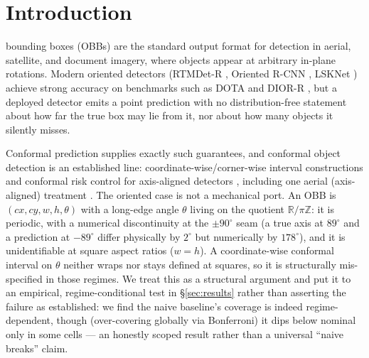 \documentclass[journal]{IEEEtran}
\begin{document}
\section{Introduction}\label{sec:intro}
 bounding boxes (OBBs) are the standard output format for detection in aerial,
satellite, and document imagery, where objects appear at arbitrary in-plane rotations. Modern oriented detectors
(RTMDet-R \citep{lyu2022rtmdet}, Oriented R-CNN \citep{xie2021orcnn}, LSKNet \citep{li2023lsknet}) achieve
strong accuracy on benchmarks such as DOTA \citep{xia2018dota} and DIOR-R \citep{cheng2022diorr}, but a
deployed detector emits a point prediction with no distribution-free statement about how far the true
box may lie from it, nor about how many objects it silently misses.

Conformal prediction supplies exactly such guarantees, and conformal object detection is an established line:
coordinate-wise/corner-wise interval constructions and conformal risk control for axis-aligned detectors
\citep{andeol2023conformal,timans2024twostep,andeol2025seqcrc,ries2026probabilistic,angelopoulos2022crc},
including one aerial (axis-aligned) treatment \citep{copley2024copa}. The oriented case is not a
mechanical port. An OBB is $(cx, cy, w, h, \theta)$ with a long-edge angle $\theta$ living on the quotient
$\mathbb{R}/\pi\mathbb{Z}$: it is periodic, with a numerical discontinuity at the $\pm 90^\circ$ seam (a true
axis at $89^\circ$ and a prediction at $-89^\circ$ differ physically by $2^\circ$ but numerically by
$178^\circ$), and it is unidentifiable at square aspect ratios ($w=h$). A coordinate-wise conformal interval
on $\theta$ neither wraps nor stays defined at squares, so it is structurally mis-specified in those
regimes. We treat this as a structural argument and put it to an empirical, regime-conditional test in
\S\ref{sec:results} rather than asserting the failure as established: we find the naive baseline's coverage is
indeed regime-dependent, though (over-covering globally via Bonferroni) it dips below nominal only in some
cells --- an honestly scoped result rather than a universal ``naive breaks'' claim.
\end{document}
